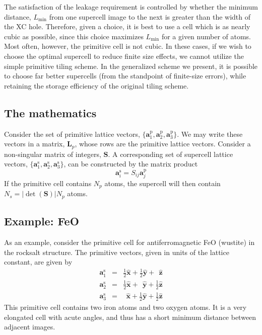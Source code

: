 The satisfaction of the leakage requirement is controlled by whether
the minimum distance, $L_\text{min}$ from one supercell image to the
next is greater than the width of the XC hole.  Therefore, given a
choice, it is best to use a cell which is as nearly cubic as possible,
since this choice maximizes $L_\text{min}$ for a given number of
atoms.  Most often, however, the primitive cell is not cubic.  In
these cases, if we wish to choose the optimal supercell to reduce
finite size effects, we cannot utilize the simple primitive tiling
scheme.  In the generalized scheme we present, it is possible to
choose far better supercells (from the standpoint of finite-size
errors), while retaining the storage efficiency of the original tiling
scheme.

\subsection{The mathematics}
\renewcommand{\vp}{\mathbf{a}^\text{p}}
\renewcommand{\vs}{\mathbf{a}^\text{s}} 
\renewcommand{\Smat}{\mathbf{S}}
Consider the set of primitive lattice vectors, $\{\vp_1, \vp_2,
\vp_3\}$.  We may write these vectors in a matrix, $\mathbf{L}_p$, whose
rows are the primitive lattice vectors.  Consider a non-singular
matrix of integers, $\Smat$.  A corresponding set of supercell lattice
vectors, $\{\vs_1, \vs_2, \vs_3\}$, can be constructed by the matrix
product 
\begin{equation}
\vs_i = S_{ij} \vp_j
\end{equation}
If the primitive cell contains $N_p$ atoms, the supercell will then
contain $N_s = |\det(\Smat)| N_p$ atoms.

\subsection{Example: FeO}
As an example, consider the primitive cell for antiferromagnetic FeO
(wustite) in the rocksalt structure.  The primitive vectors, given in
units of the lattice constant, are given by
\newcommand{\xv}{\hat{\mathbf{x}}} 
\newcommand{\yv}{\hat{\mathbf{y}}}
\newcommand{\zv}{\hat{\mathbf{z}}}
\begin{eqnarray}
\vs_1 & = & \frac{1}{2}\xv + \frac{1}{2}\yv +      \ \   \zv \\
\vs_2 & = & \frac{1}{2}\xv +      \ \   \yv + \frac{1}{2}\zv \\
\vs_3 & = &   \ \      \xv + \frac{1}{2}\yv + \frac{1}{2}\zv 
\end{eqnarray}
This primitive cell contains two iron atoms and two oxygen atoms. It
is a very elongated cell with acute angles, and thus has a short
minimum distance between adjacent images.

